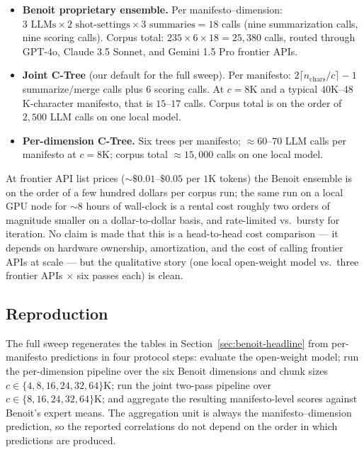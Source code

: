 \begin{itemize}[leftmargin=1.5em]
    \item \textbf{Benoit proprietary ensemble.} Per manifesto--dimension:
          $3 \text{ LLMs} \times 2 \text{ shot-settings} \times 3 \text{ summaries} = 18$
          calls (nine summarization calls, nine scoring calls). Corpus
          total: $235\times 6\times 18 = 25{,}380$ calls, routed
          through GPT-4o, Claude 3.5 Sonnet, and Gemini 1.5 Pro
          frontier APIs.
    \item \textbf{Joint C-Tree} (our default for the full sweep).
          Per manifesto: $2\lceil n_{\text{chars}}/c\rceil - 1$
          summarize/merge calls plus $6$ scoring calls. At
          $c = 8\mathrm{K}$ and a typical $40$K--$48$K-character
          manifesto, that is $15$--$17$ calls. Corpus total is on the
          order of $2{,}500$ LLM calls on one local model.
    \item \textbf{Per-dimension C-Tree.} Six trees per manifesto;
          $\approx 60$--$70$ LLM calls per manifesto at
          $c = 8\mathrm{K}$; corpus total $\approx 15{,}000$ calls on
          one local model.
\end{itemize}

At frontier API list prices ($\sim\!\$0.01$--$\$0.05$ per $1$K
tokens) the Benoit ensemble is on the order of a few hundred dollars
per corpus run; the same run on a local GPU node for $\sim\!8$ hours
of wall-clock is a rental cost roughly two orders of magnitude smaller
on a dollar-to-dollar basis, and rate-limited vs.\ bursty for
iteration. No claim is made that this is a head-to-head cost
comparison --- it depends on hardware ownership, amortization,
and the cost of calling frontier APIs at scale --- but the
qualitative story (one local open-weight model vs.\ three frontier
APIs $\times$ six passes each) is clean.

\subsection{Reproduction}

The full sweep regenerates the tables in Section~\ref{sec:benoit-headline}
from per-manifesto predictions in four protocol steps: evaluate the
open-weight model; run the per-dimension pipeline over the six Benoit
dimensions and chunk sizes
$c \in \{4, 8, 16, 24, 32, 64\}\mathrm{K}$; run the joint two-pass
pipeline over $c \in \{8, 16, 24, 32, 64\}\mathrm{K}$; and aggregate the
resulting manifesto-level scores against Benoit's expert means. The
aggregation unit is always the manifesto--dimension prediction, so the
reported correlations do not depend on the order in which predictions
are produced.

